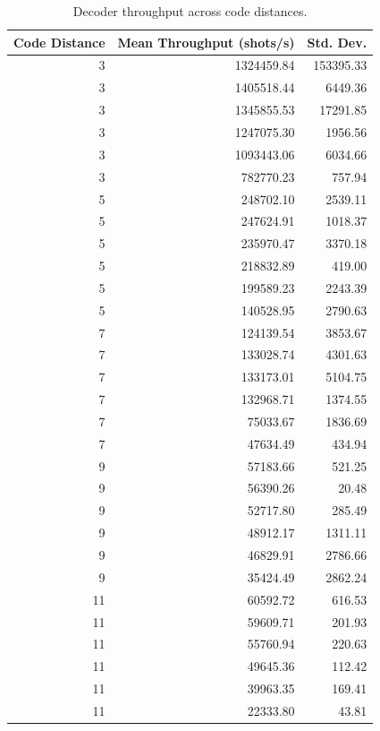\begin{table}
\caption{Decoder throughput across code distances.}
\label{tab:throughput}
\begin{tabular}{rrr}
\toprule
Code Distance & Mean Throughput (shots/s) & Std. Dev. \\
\midrule
3 & 1324459.84 & 153395.33 \\
3 & 1405518.44 & 6449.36 \\
3 & 1345855.53 & 17291.85 \\
3 & 1247075.30 & 1956.56 \\
3 & 1093443.06 & 6034.66 \\
3 & 782770.23 & 757.94 \\
5 & 248702.10 & 2539.11 \\
5 & 247624.91 & 1018.37 \\
5 & 235970.47 & 3370.18 \\
5 & 218832.89 & 419.00 \\
5 & 199589.23 & 2243.39 \\
5 & 140528.95 & 2790.63 \\
7 & 124139.54 & 3853.67 \\
7 & 133028.74 & 4301.63 \\
7 & 133173.01 & 5104.75 \\
7 & 132968.71 & 1374.55 \\
7 & 75033.67 & 1836.69 \\
7 & 47634.49 & 434.94 \\
9 & 57183.66 & 521.25 \\
9 & 56390.26 & 20.48 \\
9 & 52717.80 & 285.49 \\
9 & 48912.17 & 1311.11 \\
9 & 46829.91 & 2786.66 \\
9 & 35424.49 & 2862.24 \\
11 & 60592.72 & 616.53 \\
11 & 59609.71 & 201.93 \\
11 & 55760.94 & 220.63 \\
11 & 49645.36 & 112.42 \\
11 & 39963.35 & 169.41 \\
11 & 22333.80 & 43.81 \\
\bottomrule
\end{tabular}
\end{table}
